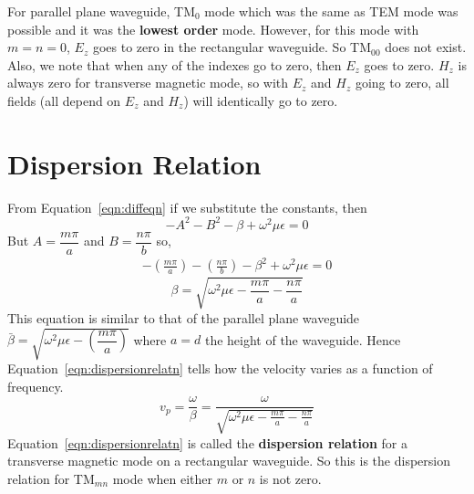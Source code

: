For parallel plane waveguide, TM$_0$ mode which was the same as TEM mode was possible and it was the \textbf{lowest order} mode. However, for this mode with $m=n=0$, $E_z$ goes to zero in the rectangular waveguide. So TM$_{00}$ does not exist. Also, we note that when any of the indexes go to zero, then $E_z$ goes to zero. $H_z$ is always zero for transverse magnetic mode, so with $E_z$ and $H_z$ going to zero, all fields (all depend on $E_z$ and $H_z$) will identically go to zero. 

\section{Dispersion Relation}
From Equation~\eqref{eqn:diffeqn} if we substitute the constants, then
\begin{dmath*}
-A^2 - B^2 - \beta + \omega^2\mu\epsilon = 0
\end{dmath*}
But $A=\dfrac{m\pi}{a}$ and $B=\dfrac{n\pi}{b}$ so,
\begin{align}
-\left(\frac{m\pi}{a}\right) - \left(\frac{n\pi}{b}\right) - \beta^{2} + {\omega^2\mu\epsilon} = 0
\label{eqn:hrec}
\end{align}
\begin{equation}
\beta = \sqrt{{\omega^2\mu\epsilon} - \frac{m\pi}{a} - \frac{n\pi}{a}}
\label{eqn:dispersionrelatn}
\end{equation}
This equation is similar to that of the parallel plane waveguide $\bar{\beta} = \sqrt{\omega^2\mu\epsilon - \left(\dfrac{m\pi}{a}\right)}$ where $a=d$ the height of the waveguide. Hence Equation~\eqref{eqn:dispersionrelatn} tells how the velocity varies as a function of frequency.
\begin{dmath*}
v_p = \frac{\omega}{\beta} = \frac{\omega}{\sqrt{{\omega^2\mu\epsilon} - \frac{m\pi}{a} - \frac{n\pi}{a}}}
\end{dmath*}
Equation~\eqref{eqn:dispersionrelatn} is called the \textbf{dispersion relation} for a transverse magnetic mode on a rectangular waveguide. So this is the dispersion relation for TM$_{mn}$ mode when either $m$ or $n$ is not zero. 

